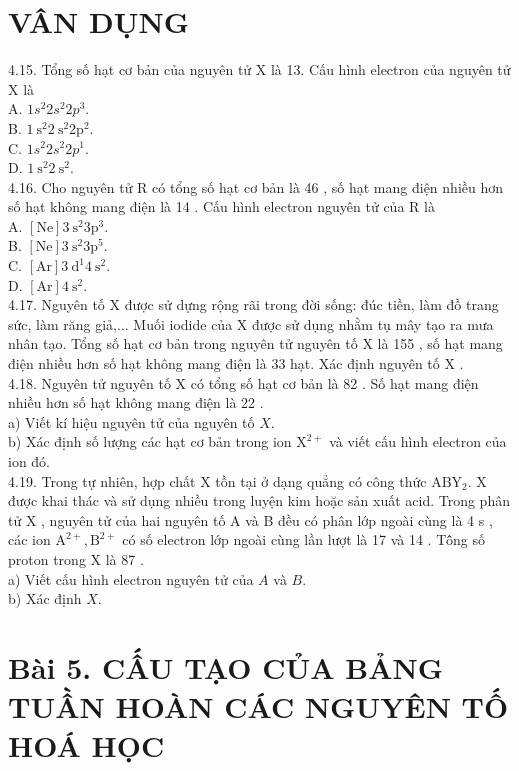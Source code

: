 \documentclass[10pt]{article}
\begin{document}
\section*{VÂN DỤNG}
4.15. Tổng số hạt cơ bản của nguyên tử X là 13. Cấu hình electron của nguyên tử X là\\
A. $1 s^{2} 2 s^{2} 2 p^{3}$.\\
B. $1 \mathrm{~s}^{2} 2 \mathrm{~s}^{2} 2 \mathrm{p}^{2}$.\\
C. $1 s^{2} 2 s^{2} 2 p^{1}$.\\
D. $1 \mathrm{~s}^{2} 2 \mathrm{~s}^{2}$.\\
4.16. Cho nguyên tử R có tổng số hạt cơ bản là 46 , số hạt mang điện nhiều hơn số hạt không mang điện là 14 . Cấu hình electron nguyên tử của R là\\
A. $[\mathrm{Ne}] 3 \mathrm{~s}^{2} 3 \mathrm{p}^{3}$.\\
B. $[\mathrm{Ne}] 3 \mathrm{~s}^{2} 3 \mathrm{p}^{5}$.\\
C. $[\mathrm{Ar}] 3 \mathrm{~d}^{1} 4 \mathrm{~s}^{2}$.\\
D. $[\mathrm{Ar}] 4 \mathrm{~s}^{2}$.\\
4.17. Nguyên tố X được sử dựng rộng rãi trong đời sống: đúc tiền, làm đồ trang sức, làm răng giả,... Muối iodide của X được sử dụng nhằm tụ mây tạo ra mưa nhân tạo. Tổng số hạt cơ bản trong nguyên tử nguyên tố X là 155 , số hạt mang điện nhiều hơn số hạt không mang điện là 33 hạt. Xác định nguyên tố X .\\
4.18. Nguyên tử nguyên tố X có tổng số hạt cơ bản là 82 . Số hạt mang điện nhiều hơn số hạt không mang điện là 22 .\\
a) Viết kí hiệu nguyên tử của nguyên tố $X$.\\
b) Xác định số lượng các hạt cơ bản trong ion $\mathrm{X}^{2+}$ và viết cấu hình electron của ion đó.\\
4.19. Trong tự nhiên, hợp chất X tồn tại ở dạng quẳng có công thức $\mathrm{ABY}_{2}$. X được khai thác và sử dụng nhiều trong luyện kim hoặc sản xuất acid. Trong phân tử X , nguyên tử của hai nguyên tố A và B đều có phân lớp ngoài cùng là 4 s , các ion $\mathrm{A}^{2+}, \mathrm{B}^{2+}$ có số electron lớp ngoài cùng lần lượt là 17 và 14 . Tô̂ng số proton trong X là 87 .\\
a) Viết cấu hình electron nguyên tử của $A$ và $B$.\\
b) Xác định $X$.

\section*{Bài 5. CẤU TẠO CỦA BẢNG TUẦN HOÀN CÁC NGUYÊN TỐ HOÁ HỌC}
\end{document}
